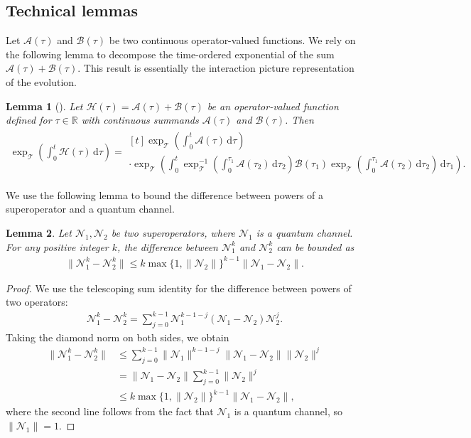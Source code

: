 \documentclass[11pt]{article}
\newtheorem{lemma}{Lemma}
\renewcommand{\d}{\mathrm{d}}
\newcommand{\mc}{\mathcal}
\begin{document}
\subsection{Technical lemmas}
Let $\mc A(\tau)$ and $\mc B(\tau)$ be two continuous operator-valued functions. We rely on the following lemma to decompose the time-ordered exponential of the sum $\mc A(\tau) + \mc B(\tau)$. This result is essentially the interaction picture representation of the evolution.
\begin{lemma}[{\cite[Page 21]{dollard1984product}}]
\label{lem:interaction-pic}
    Let $\mc H(\tau) = \mc A(\tau) + \mc B(\tau)$ be an operator-valued function defined for $\tau \in \mathbb{R}$ with continuous summands $\mc A(\tau)$ and $\mc B(\tau)$. Then
    \begin{align*}
    \exp_{\mc T}\left(\int_{0}^{t}  \mc H(\tau)\, \d \tau\right) =  \begin{multlined}[t]
        \exp_{\mc T}\left(\int_{0}^{t}  \mc A(\tau)\, \d \tau\right) \\
     \cdot \exp_{\mc T}\left(\int_{0}^{t}\exp_{\mc T}^{-1}\left(\int_{0}^{\tau_1}  \mc A(\tau_2)\, \d \tau_2\right)\mc  B(\tau_1) \exp_{\mc T}\left(\int_{0}^{\tau_1}\mc  A(\tau_2)\, \d \tau_2\right)\, \d \tau_1\right).
    \end{multlined}
    \end{align*}
\end{lemma} 
We use the following lemma to bound the difference between powers of a superoperator and a quantum channel. 
\begin{lemma}
\label{lem:power-bound}
    Let $\mc N_1, \mc N_2$ be two superoperators, where $\mc N_1$ is a quantum channel. For any positive integer $k$, the difference between $\mc N_1^k$ and $\mc N_2^{k}$ can be bounded as
    \begin{align*}
        \|\mc N_1^k-\mc N_2^k\| \le k \max\{1, \|\mc N_2\|\}^{k-1} \|\mc N_1-\mc N_2\|.
    \end{align*}
\end{lemma}
\begin{proof}
    We use the telescoping sum identity for the difference between powers of two operators:
    \begin{align*}
        \mc N_1^k - \mc N_2^k = \sum_{j=0}^{k-1} \mc N_1^{k-1-j} (\mc N_1 - \mc N_2) \mc N_2^j.
    \end{align*}
    Taking the diamond norm on both sides, we obtain
    \begin{align*}
        \|\mc N_1^k - \mc N_2^k\| &\le \sum_{j=0}^{k-1} \|\mc N_1\|^{k-1-j} \|\mc N_1 - \mc N_2\| \|\mc N_2\|^j \\
        &= \|\mc N_1 - \mc N_2\| \sum_{j=0}^{k-1} \|\mc N_2\|^j \\
        &\le k\max\{1, \|\mc N_2\|\}^{k-1}\|\mc N_1-\mc N_2\|,
    \end{align*}
    where the second line follows from the fact that $\mc N_1$ is a quantum channel, so $\|\mc N_1\|=1$. 
\end{proof}
\end{document}
